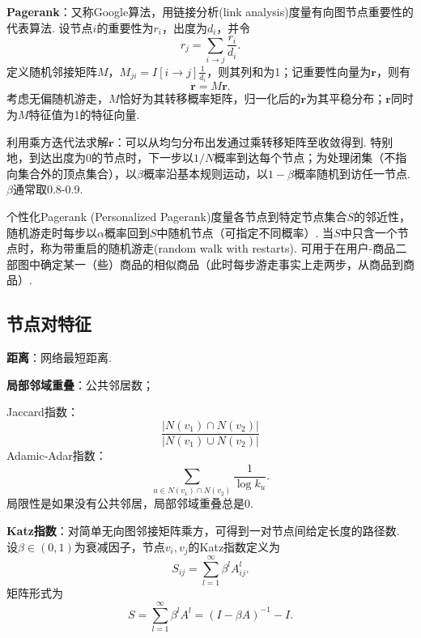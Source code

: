 \par \textbf{Pagerank}：又称Google算法，用链接分析(link analysis)度量有向图节点重要性的代表算法. 设节点$i$的重要性为$r_i$，出度为$d_i$，并令
\begin{equation}
    r_j=\sum_{i\to j}\frac{r_i}{d_i}.
\end{equation}
定义随机邻接矩阵$M$，$M_{ji}=I[i\to j] \frac{1}{d_i}$，则其列和为1；记重要性向量为$\mathbf{r}$，则有
\begin{equation}
    \mathbf{r}=M\mathbf{r}.
\end{equation}
考虑无偏随机游走，$M$恰好为其转移概率矩阵，归一化后的$\mathbf{r}$为其平稳分布；$\mathbf{r}$同时为$M$特征值为1的特征向量. 
\par 利用乘方迭代法求解$\mathbf{r}$：可以从均匀分布出发通过乘转移矩阵至收敛得到. 特别地，到达出度为0的节点时，下一步以$1/N$概率到达每个节点；为处理闭集（不指向集合外的顶点集合），以$\beta$概率沿基本规则运动，以$1-\beta$概率随机到访任一节点. $\beta$通常取0.8-0.9. 

\par 个性化Pagerank (Personalized Pagerank)度量各节点到特定节点集合$S$的邻近性，随机游走时每步以$\alpha$概率回到$S$中随机节点（可指定不同概率）. 当$S$中只含一个节点时，称为带重启的随机游走(random walk with restarts). 可用于在用户-商品二部图中确定某一（些）商品的相似商品（此时每步游走事实上走两步，从商品到商品）. 

\subsection{节点对特征}

\par \textbf{距离}：网络最短距离. 
\par \textbf{局部邻域重叠}：公共邻居数；
\par Jaccard指数：
\begin{equation}
    \frac{\vert N(v_1)\cap N(v_2)\vert}{\vert N(v_1)\cup N(v_2)\vert}
\end{equation}
Adamic-Adar指数：
\begin{equation}
    \sum_{u\in N(v_1)\cap N(v_2)} \frac{1}{\log k_u}.
\end{equation}
局限性是如果没有公共邻居，局部邻域重叠总是0.

\par \textbf{Katz指数}：对简单无向图邻接矩阵乘方，可得到一对节点间给定长度的路径数. 设$\beta \in (0,1)$为衰减因子，节点$v_i,v_j$的Katz指数定义为
\begin{equation}
    S_{ij}=\sum_{l=1}^\infty \beta^l A^l_{ij}.
\end{equation}
矩阵形式为
\begin{equation}
    S=\sum_{l=1}^\infty \beta^l A^l=(I-\beta A)^{-1}-I.
\end{equation}


